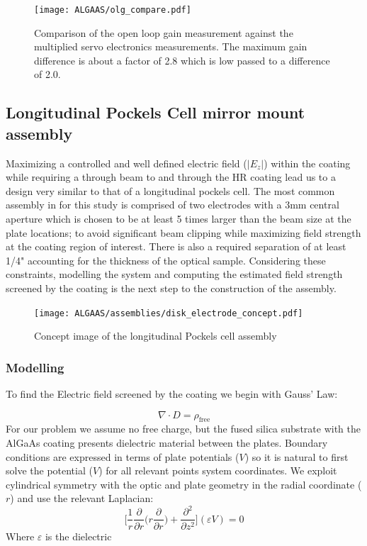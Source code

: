 \begin{figure}[H]
\begin{center}
\texttt{[image: ALGAAS/olg\_compare.pdf]}
\end{center}
\caption{Comparison of the open loop gain measurement against the multiplied servo electronics measurements. The maximum gain difference is about a factor of 2.8 which is low passed to a difference of 2.0.}
\label{fig:OLGcompare}
\end{figure}


\subsection{Longitudinal Pockels Cell mirror mount assembly}
Maximizing a controlled and well defined electric field ($|E_z|$) within the coating while requiring a through beam to and through the HR coating lead us to a design very similar to that of a longitudinal pockels cell. The most common assembly in for this study is comprised of two electrodes with a 3mm central aperture which is chosen to be at least 5 times larger than the beam size at the plate locations; to avoid significant beam clipping while maximizing field strength at the coating region of interest. There is also a required separation of at least 1/4" accounting for the thickness of the optical sample. Considering these constraints, modelling the system and computing the estimated field strength screened by the coating is the next step to the construction of the assembly.

\begin{figure}[H]
\begin{center}
\texttt{[image: ALGAAS/assemblies/disk\_electrode\_concept.pdf]}
\end{center}
\caption{Concept image of the longitudinal Pockels cell assembly}
\label{fig:pckcellconcept}
\end{figure}

\subsubsection{Modelling}

To find the Electric field screened by the coating we begin with Gauss' Law:

\begin{equation}
\nabla \cdot D = \rho_\mathrm{free}
\end{equation}
For our problem we assume no free charge, but the fused silica substrate with the AlGaAs coating presents dielectric material between the plates. Boundary conditions are expressed in terms of plate potentials ($V$) so it is natural to first solve the potential ($V$) for all relevant points system coordinates. We exploit cylindrical symmetry with the optic and plate geometry in the radial coordinate ($r$) and use the relevant Laplacian: 
\begin{equation}
\bigg[\frac{1}{r}\frac{\partial}{\partial r} \bigg( r \frac{\partial}{\partial r}\bigg) + \frac{\partial^2}{\partial z^2}\bigg](\varepsilon V) = 0
\end{equation}
Where $\varepsilon$ is the dielectric

